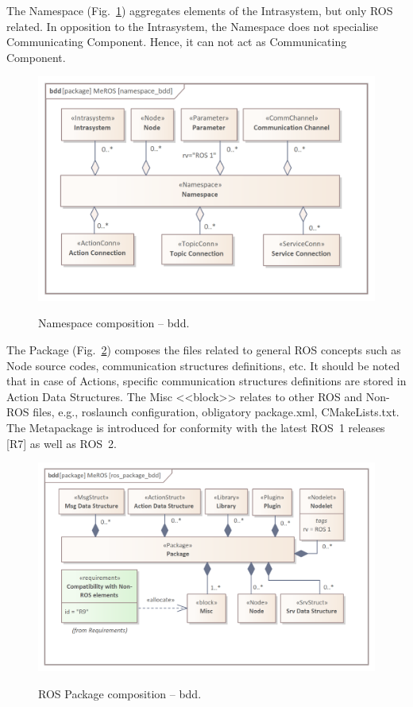 \pagebreak

The Namespace (Fig.~\ref{fig:namespace_bdd}) aggregates elements of the Intrasystem, but only ROS related. In opposition to the Intrasystem, the Namespace does not specialise Communicating Component. Hence, it can not act as Communicating Component.


\begin{figure}[H]
    \centering
    \begin{center}
    {\includegraphics[scale=1.0]{../imgs/meros_pkg/namespace_bdd.png}}
    \end{center}
    \caption{Namespace composition -- bdd.}
    \label{fig:namespace_bdd}
\end{figure}


The Package (Fig.~\ref{fig:ros_package_bdd}) composes the files related to general ROS concepts such as Node source codes, communication structures definitions, etc. It should be noted that in case of Actions, specific communication structures definitions are stored in Action Data Structures. The Misc <<block>> relates to other ROS and Non-ROS files, e.g., roslaunch configuration, obligatory package.xml, CMakeLists.txt. The Metapackage is introduced for conformity with the latest ROS~1 releases [R7] as well as ROS~2.


\begin{figure}[H]
    \centering
    \begin{center}
    {\includegraphics[scale=1.0]{../imgs/meros_pkg/ros_package_bdd.png}}
    \end{center}
    \caption{ROS Package composition -- bdd.}
    \label{fig:ros_package_bdd}
\end{figure}

